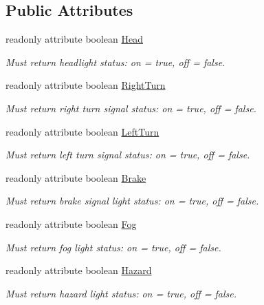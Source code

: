 \subsection*{Public Attributes}
\begin{DoxyCompactItemize}
\item 
readonly attribute boolean \hyperlink{interfaceVehicle_1_1LightStatus_a39343ff742b60d91613d8649bb86ebb7}{Head}
\begin{DoxyCompactList}\small\item\em Must return headlight status\-: on = true, off = false. \end{DoxyCompactList}\item 
readonly attribute boolean \hyperlink{interfaceVehicle_1_1LightStatus_a8d77780fdf8807d228aa8777e27fcc0a}{Right\-Turn}
\begin{DoxyCompactList}\small\item\em Must return right turn signal status\-: on = true, off = false. \end{DoxyCompactList}\item 
readonly attribute boolean \hyperlink{interfaceVehicle_1_1LightStatus_a89443871ed46a45e98640ec1eaa327f8}{Left\-Turn}
\begin{DoxyCompactList}\small\item\em Must return left turn signal status\-: on = true, off = false. \end{DoxyCompactList}\item 
readonly attribute boolean \hyperlink{interfaceVehicle_1_1LightStatus_aa4bf3545245f92917c7719c3b90f53da}{Brake}
\begin{DoxyCompactList}\small\item\em Must return brake signal light status\-: on = true, off = false. \end{DoxyCompactList}\item 
readonly attribute boolean \hyperlink{interfaceVehicle_1_1LightStatus_a615c415bc6fa17cda0be239e6517b6d7}{Fog}
\begin{DoxyCompactList}\small\item\em Must return fog light status\-: on = true, off = false. \end{DoxyCompactList}\item 
readonly attribute boolean \hyperlink{interfaceVehicle_1_1LightStatus_a588f593d003580e3208ea362e140f332}{Hazard}
\begin{DoxyCompactList}\small\item\em Must return hazard light status\-: on = true, off = false. \end{DoxyCompactList}\item 

\end{DoxyCompactItemize}

